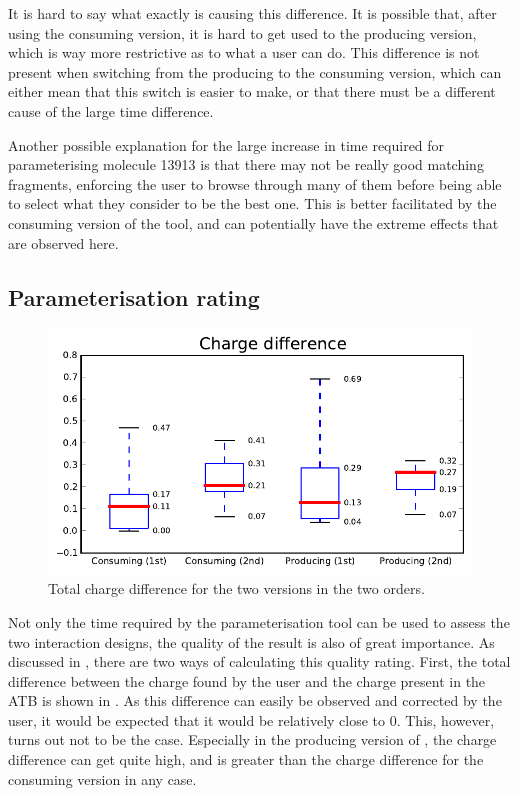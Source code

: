 It is hard to say what exactly is causing this difference. It is possible that, after using the consuming version, it is hard to get used to the producing version, which is way more restrictive as to what a user can do. This difference is not present when switching from the producing to the consuming version, which can either mean that this switch is easier to make, or that there must be a different cause of the large time difference.

Another possible explanation for the large increase in time required for parameterising molecule 13913 is that there may not be really good matching fragments, enforcing the user to browse through many of them before being able to select what they consider to be the best one. This is better facilitated by the consuming version of the tool, and can potentially have the extreme effects that are observed here.



\subsection{Parameterisation rating}

\begin{figure}
\center
\includegraphics[width=.6\textwidth]{img/graphs/1a_00.pdf}
\caption{Total charge difference for the two versions in the two orders.}
\end{figure}

Not only the time required by the parameterisation tool can be used to assess the two interaction designs, the quality of the result is also of great importance. As discussed in , there are two ways of calculating this quality rating. First, the total difference between the charge found by the user and the charge present in the ATB is shown in . As this difference can easily be observed and corrected by the user, it would be expected that it would be relatively close to 0. This, however, turns out not to be the case. Especially in the producing version of \oframp, the charge difference can get quite high, and is greater than the charge difference for the consuming version in any case.

